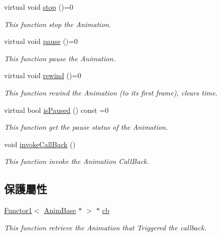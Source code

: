 \begin{DoxyCompactItemize}
virtual void \hyperlink{class_magnum_1_1_anim_base_aab11d1fa24d0512928c0c605a1d1251b}{stop} ()=0
\begin{DoxyCompactList}\small\item\em This function stop the Animation. \end{DoxyCompactList}\item 
virtual void \hyperlink{class_magnum_1_1_anim_base_adcd01579f036fd968f8a785c767704be}{pause} ()=0
\begin{DoxyCompactList}\small\item\em This function pause the Animation. \end{DoxyCompactList}\item 
virtual void \hyperlink{class_magnum_1_1_anim_base_ab46d4859b6c145908395aa4a7ee64024}{rewind} ()=0
\begin{DoxyCompactList}\small\item\em This function rewind the Animation (to its first frame), clears time. \end{DoxyCompactList}\item 
virtual bool \hyperlink{class_magnum_1_1_anim_base_a7659048633d3fa2a8ed35a569dd23b9f}{is\+Paused} () const  =0
\begin{DoxyCompactList}\small\item\em This function get the pause status of the Animation. \end{DoxyCompactList}\item 
void \hyperlink{class_magnum_1_1_anim_base_a179fb12b7a4cca8f6eb47ca1ebe95fab}{invoke\+Call\+Back} ()
\begin{DoxyCompactList}\small\item\em This function invoke the Animation Call\+Back. \end{DoxyCompactList}\end{DoxyCompactItemize}
\subsection*{保護屬性}
\begin{DoxyCompactItemize}
\item 
\hyperlink{class_magnum_1_1_functor1}{Functor1}$<$ \hyperlink{class_magnum_1_1_anim_base}{Anim\+Base} $\ast$ $>$ $\ast$ \hyperlink{class_magnum_1_1_anim_base_aef3da1af5c5b0877ed67f54b5e8ff726}{cb}
\begin{DoxyCompactList}\small\item\em This function retrieve the Animation that Triggered the callback. \end{DoxyCompactList}\end{DoxyCompactItemize}


